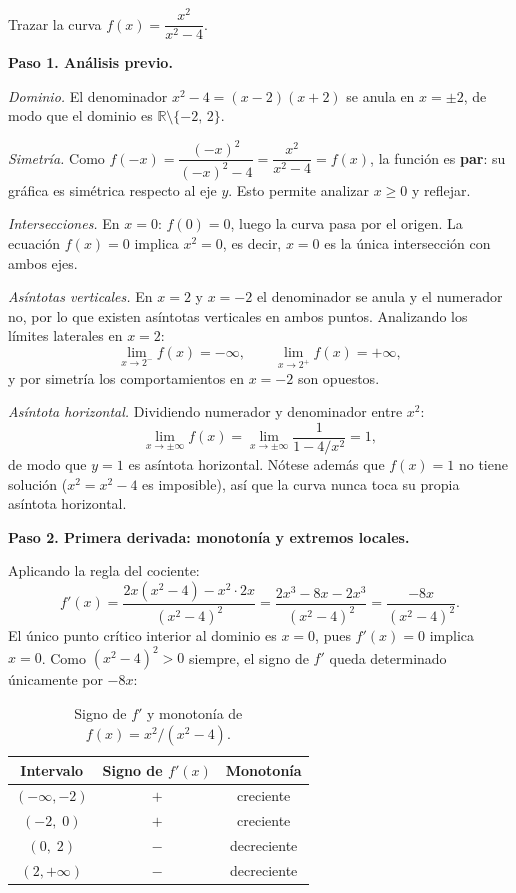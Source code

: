 \begin{example}[Trazado de $f(x)=x^2/(x^2-4)$]
Trazar la curva $f(x)=\dfrac{x^2}{x^2-4}$.
\begin{myproof}
\textbf{Paso 1. Análisis previo.}

\emph{Dominio.} El denominador $x^2-4=(x-2)(x+2)$ se anula en $x=\pm2$,
de modo que el dominio es $\mathbb{R}\setminus\{-2,\,2\}$.

\emph{Simetría.} Como $f(-x)=\dfrac{(-x)^2}{(-x)^2-4}=\dfrac{x^2}{x^2-4}=f(x)$,
la función es \textbf{par}: su gráfica es simétrica respecto al eje $y$.
Esto permite analizar $x\geq 0$ y reflejar.

\emph{Intersecciones.} En $x=0$: $f(0)=0$, luego la curva pasa por el
origen. La ecuación $f(x)=0$ implica $x^2=0$, es decir, $x=0$ es la
única intersección con ambos ejes.

\emph{Asíntotas verticales.} En $x=2$ y $x=-2$ el denominador se anula
y el numerador no, por lo que existen asíntotas verticales en ambos
puntos. Analizando los límites laterales en $x=2$:
\[
\lim_{x\to 2^-}f(x)=-\infty, \qquad \lim_{x\to 2^+}f(x)=+\infty,
\]
y por simetría los comportamientos en $x=-2$ son opuestos.

\emph{Asíntota horizontal.} Dividiendo numerador y denominador entre
$x^2$:
\[
\lim_{x\to\pm\infty}f(x)=\lim_{x\to\pm\infty}\frac{1}{1-4/x^2}=1,
\]
de modo que $y=1$ es asíntota horizontal. Nótese además que $f(x)=1$
no tiene solución ($x^2=x^2-4$ es imposible), así que la curva nunca
toca su propia asíntota horizontal.

\textbf{Paso 2. Primera derivada: monotonía y extremos locales.}

Aplicando la regla del cociente:
\[
f'(x)
= \frac{2x(x^2-4)-x^2\cdot 2x}{(x^2-4)^2}
= \frac{2x^3-8x-2x^3}{(x^2-4)^2}
= \frac{-8x}{(x^2-4)^2}.
\]
El único punto crítico interior al dominio es $x=0$, pues $f'(x)=0$
implica $x=0$. Como $(x^2-4)^2>0$ siempre, el signo de $f'$ queda
determinado únicamente por $-8x$:

\begin{table}[H]
\centering
\begin{tabular}{c c c}
\toprule
Intervalo & Signo de $f'(x)$ & Monotonía \\
\midrule
$(-\infty,-2)$ & $+$ & creciente \\
$(-2,\;0)$     & $+$ & creciente \\
$(0,\;2)$      & $-$ & decreciente \\
$(2,+\infty)$  & $-$ & decreciente \\
\bottomrule
\end{tabular}
\caption{Signo de $f'$ y monotonía de $f(x)=x^2/(x^2-4)$.}
\end{table}


\end{myproof}
\end{example}
